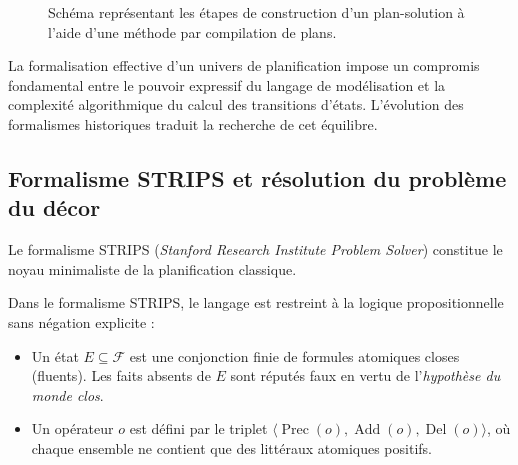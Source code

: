 \begin{figure}[htpb]
    \centering
    \caption{Schéma représentant les étapes de construction d'un plan-solution à l'aide d'une méthode par compilation de plans.}
    \label{fig:pipeline-resolution-generique}
\end{figure}

La formalisation effective d'un univers de planification impose un compromis fondamental entre le pouvoir expressif du langage de modélisation et la complexité algorithmique du calcul des transitions d'états. L'évolution des formalismes historiques traduit la recherche de cet équilibre.

\subsection{Formalisme STRIPS et résolution du problème du décor}

Le formalisme STRIPS (\emph{Stanford Research Institute Problem Solver}) constitue le noyau minimaliste de la planification classique.

\begin{definition}
    Dans le formalisme STRIPS, le langage est restreint à la logique propositionnelle sans négation explicite :
    \begin{itemize}
        \item Un état $E \subseteq \mathcal{F}$ est une conjonction finie de formules atomiques closes (fluents). Les faits absents de $E$ sont réputés faux en vertu de l'\emph{hypothèse du monde clos}.
        \item Un opérateur $o$ est défini par le triplet $\langle \operatorname{Prec}(o), \operatorname{Add}(o), \operatorname{Del}(o) \rangle$, où chaque ensemble ne contient que des littéraux atomiques positifs.
    \end{itemize}
\end{definition}

